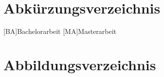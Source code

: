 \documentclass[12pt,a4paper,bibliography=totoc,listof=totoc]{scrartcl}
\begin{document}
\section{Abkürzungsverzeichnis}
\begin{acronym}[KDE]
	[BA]{Bachelorarbeit}
	[MA]{Masterarbeit}

\end{acronym}
\pagebreak


\section {Abbildungsverzeichnis}
\listoffigures
\pagebreak

\listoftables
\pagebreak


\renewcommand\refname{Literaturverzeichnis}
\lhead{}
%


\pagebreak
\end{document}
